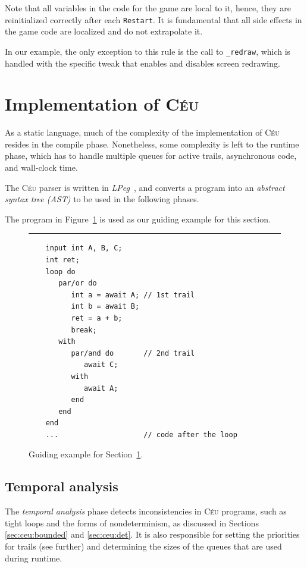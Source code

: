 \documentclass{sigplan-proc}
\newcommand{\2}{\;\;}
\newcommand{\5}{\;\;\;\;\;}
\newcommand{\CEU}{\textsc{C\'{e}u}}
\newcommand{\code}[1] {{\small{\texttt{#1}}}}
\begin{document}
Note that all variables in the code for the game are local to it, hence, they 
are reinitialized correctly after each \code{Restart}.
It is fundamental that all side effects in the game code are localized and do 
not extrapolate it.

In our example, the only exception to this rule is the call to \code{\_redraw}, 
which is handled with the specific tweak that enables and disables screen 
redrawing.

\section{Implementation of \CEU}
\label{sec:impl}

As a static language, much of the complexity of the implementation of \CEU{} 
resides in the compile phase.
Nonetheless, some complexity is left to the runtime phase, which has to handle 
multiple queues for active trails, asynchronous code, and wall-clock time.

The \CEU{} parser is written in \emph{LPeg}~\cite{lua.lpeg}, and converts a 
program into an \emph{abstract syntax tree (AST)} to be used in the following 
phases.

The program in Figure~\ref{lst:impl} is used as our guiding example for this 
section.

\begin{figure}[t]
\rule{8.5cm}{0.37pt}
{\small
\begin{verbatim}
    input int A, B, C;
    int ret;
    loop do
       par/or do
          int a = await A; // 1st trail
          int b = await B;
          ret = a + b;
          break;
       with
          par/and do       // 2nd trail
             await C;
          with
             await A;
          end
       end
    end
    ...                    // code after the loop
\end{verbatim}
}
\caption{ Guiding example for Section~\ref{sec:impl}.
\label{lst:impl}
}
\end{figure}

\subsection{Temporal analysis}

The \emph{temporal analysis} phase detects inconsistencies in \CEU{} programs, 
such as tight loops and the forms of nondeterminism, as discussed in Sections 
\ref{sec:ceu:bounded} and \ref{sec:ceu:det}.
It is also responsible for setting the priorities for trails (see further) and 
determining the sizes of the queues that are used during runtime.
\end{document}
